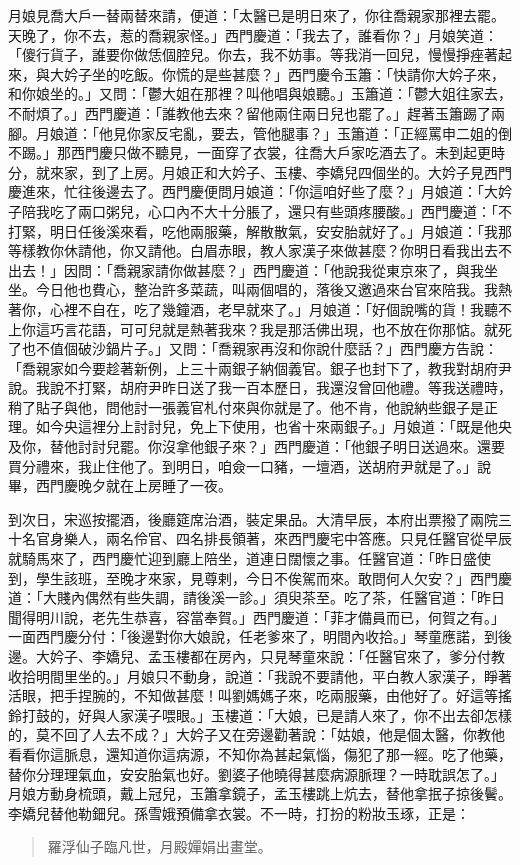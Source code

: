 月娘見喬大戶一替兩替來請，便道：「太醫已是明日來了，你往喬親家那裡去罷。天晚了，你不去，惹的喬親家怪。」西門慶道：「我去了，誰看你？」月娘笑道：「傻行貨子，誰要你做恁個腔兒。你去，我不妨事。等我消一回兒，慢慢掙痤著起來，與大妗子坐的吃飯。你慌的是些甚麼？」西門慶令玉簫：「快請你大妗子來，和你娘坐的。」又問：「鬱大姐在那裡？叫他唱與娘聽。」玉簫道：「鬱大姐往家去，不耐煩了。」西門慶道：「誰教他去來？留他兩住兩日兒也罷了。」趕著玉簫踢了兩腳。月娘道：「他見你家反宅亂，要去，管他腿事？」玉簫道：「正經罵申二姐的倒不踢。」那西門慶只做不聽見，一面穿了衣裳，往喬大戶家吃酒去了。未到起更時分，就來家，到了上房。月娘正和大妗子、玉樓、李嬌兒四個坐的。大妗子見西門慶進來，忙往後邊去了。西門慶便問月娘道：「你這咱好些了麼？」月娘道：「大妗子陪我吃了兩口粥兒，心口內不大十分脹了，還只有些頭疼腰酸。」西門慶道：「不打緊，明日任後溪來看，吃他兩服藥，解散散氣，安安胎就好了。」月娘道：「我那等樣教你休請他，你又請他。白眉赤眼，教人家漢子來做甚麼？你明日看我出去不出去！」因問：「喬親家請你做甚麼？」西門慶道：「他說我從東京來了，與我坐坐。今日他也費心，整治許多菜蔬，叫兩個唱的，落後又邀過來台官來陪我。我熱著你，心裡不自在，吃了幾鐘酒，老早就來了。」月娘道：「好個說嘴的貨！我聽不上你這巧言花語，可可兒就是熱著我來？我是那活佛出現，也不放在你那惦。就死了也不值個破沙鍋片子。」又問：「喬親家再沒和你說什麼話？」西門慶方告說：「喬親家如今要趁著新例，上三十兩銀子納個義官。銀子也封下了，教我對胡府尹說。我說不打緊，胡府尹昨日送了我一百本歷日，我還沒曾回他禮。等我送禮時，稍了貼子與他，問他討一張義官札付來與你就是了。他不肯，他說納些銀子是正理。如今央這裡分上討討兒，免上下使用，也省十來兩銀子。」月娘道：「既是他央及你，替他討討兒罷。你沒拿他銀子來？」西門慶道：「他銀子明日送過來。還要買分禮來，我止住他了。到明日，咱僉一口豬，一壇酒，送胡府尹就是了。」說畢，西門慶晚夕就在上房睡了一夜。

到次日，宋巡按擺酒，後廳筵席治酒，裝定果品。大清早辰，本府出票撥了兩院三十名官身樂人，兩名伶官、四名排長領著，來西門慶宅中答應。只見任醫官從早辰就騎馬來了，西門慶忙迎到廳上陪坐，道連日闊懷之事。任醫官道：「昨日盛使到，學生該班，至晚才來家，見尊剌，今日不俟駕而來。敢問何人欠安？」西門慶道：「大賤內偶然有些失調，請後溪一診。」須臾茶至。吃了茶，任醫官道：「昨日聞得明川說，老先生恭喜，容當奉賀。」西門慶道：「菲才備員而已，何賀之有。」一面西門慶分付：「後邊對你大娘說，任老爹來了，明間內收拾。」琴童應諾，到後邊。大妗子、李嬌兒、孟玉樓都在房內，只見琴童來說：「任醫官來了，爹分付教收拾明間里坐的。」月娘只不動身，說道：「我說不要請他，平白教人家漢子，睜著活眼，把手捏腕的，不知做甚麼！叫劉媽媽子來，吃兩服藥，由他好了。好這等搖鈴打鼓的，好與人家漢子喂眼。」玉樓道：「大娘，已是請人來了，你不出去卻怎樣的，莫不回了人去不成？」大妗子又在旁邊勸著說：「姑娘，他是個太醫，你教他看看你這脈息，還知道你這病源，不知你為甚起氣惱，傷犯了那一經。吃了他藥，替你分理理氣血，安安胎氣也好。劉婆子他曉得甚麼病源脈理？一時耽誤怎了。」月娘方動身梳頭，戴上冠兒，玉簫拿鏡子，孟玉樓跳上炕去，替他拿抿子掠後鬢。李嬌兒替他勒鈿兒。孫雪娥預備拿衣裳。不一時，打扮的粉妝玉琢，正是：
\begin{quote}
羅浮仙子臨凡世，月殿嬋娟出畫堂。
\end{quote}
